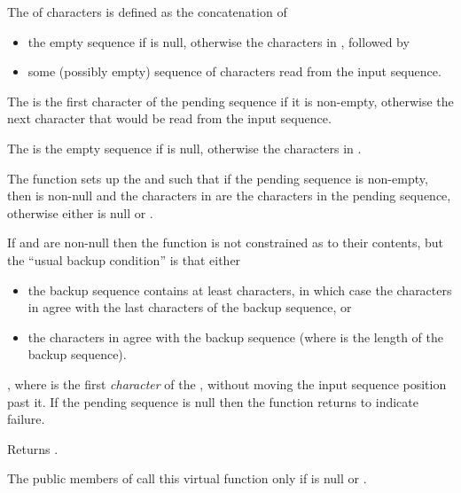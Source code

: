 \begin{itemdescr}
\pnum
The
of characters is defined as the concatenation of
\begin{itemize}
\item the empty sequence if  is null, otherwise the
characters in
,
followed by
\item
some (possibly empty) sequence of characters read from the input sequence.
\end{itemize}

\pnum
The
is
the first character of the pending sequence if it is non-empty,
otherwise
the next character that would be read from the input sequence.

\pnum
The
is the empty sequence if  is null, otherwise the
characters in
.

\pnum
\effects
The function sets up the
and
such that
if the pending sequence is non-empty, then
is non-null and
the characters in  are
the characters in the pending sequence,
otherwise
either 
is null or
.

\pnum
If
and
are non-null then the function is not constrained as to their contents, but the ``usual backup condition'' is that either
\begin{itemize}
\item
the backup sequence contains at least
characters, in which case the characters in
agree with the last
characters of the backup sequence, or
\item
the characters in 
agree with the backup sequence (where  is the length of the backup sequence).
\end{itemize}

\pnum
\returns
{},
where  is the first
\textit{character}
of the
,
without moving the input sequence position past it.
If the pending sequence is null then the function returns
to indicate failure.

\pnum
{}
Returns
.

\pnum
\remarks
The public members of
call this virtual function only if
is null or
.
\end{itemdescr}

